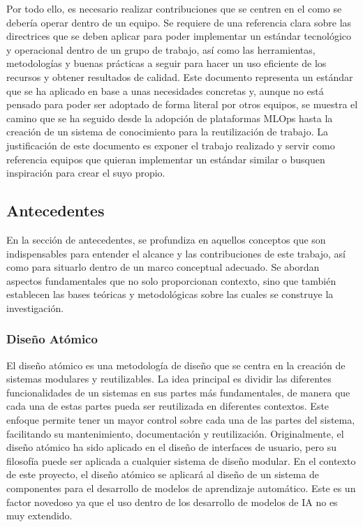 Por todo ello, es necesario realizar contribuciones que se centren en el como 
se debería operar dentro de un equipo. Se requiere de una referencia clara sobre las 
directrices que se deben aplicar para poder implementar un estándar tecnológico y
operacional dentro de un grupo de trabajo, así como las herramientas, metodologías y buenas prácticas
a seguir para hacer un uso eficiente de los recursos y obtener resultados de calidad.
Este documento representa un estándar que se ha aplicado en base a unas necesidades
concretas y, aunque no está pensado para poder ser adoptado de forma literal por otros equipos,
se muestra el camino que se ha seguido desde la adopción de plataformas MLOps hasta la creación
de un sistema de conocimiento para la reutilización de trabajo. La justificación de este
documento es exponer el trabajo realizado y servir como referencia equipos que quieran implementar
un estándar similar o busquen inspiración para crear el suyo propio.
 
\subsection{Antecedentes}
En la sección de antecedentes, se profundiza en aquellos conceptos que son 
indispensables para entender el alcance y las contribuciones de este trabajo, así como 
para situarlo dentro de un marco conceptual adecuado. Se abordan aspectos fundamentales 
que no solo proporcionan contexto, sino que también establecen las bases teóricas y 
metodológicas sobre las cuales se construye la investigación.

\subsubsection{Diseño Atómico}
El diseño atómico es una metodología de diseño que se centra en la creación
de sistemas modulares y reutilizables. La idea principal es dividir
las diferentes funcionalidades de un sistemas en sus partes más fundamentales,
de manera que cada una de estas partes pueda ser reutilizada en diferentes
contextos. Este enfoque permite tener un mayor control sobre cada una de las
partes del sistema, facilitando su mantenimiento, documentación y reutilización.
Originalmente, el diseño atómico ha sido aplicado en el diseño de interfaces
de usuario, pero su filosofía puede ser aplicada a cualquier sistema de diseño
modular. En el contexto de este proyecto, el diseño atómico se aplicará al
diseño de un sistema de componentes para el desarrollo de modelos de aprendizaje
automático. Este es un factor novedoso ya que el uso dentro de los desarrollo
de modelos de IA no es muy extendido.\medskip

